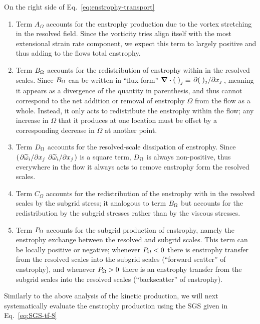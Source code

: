On the right side of Eq.~\ref{eq:enstrophy-transport}
\begin{enumerate}
    \item   
        Term $A_{\Omega}$ accounts for the enstrophy production due to the vortex stretching in the
        resolved field. Since the vorticity tries align itself  with the most extensional strain
        rate component, we expect this term to largely positive and thus adding to the flows total
        enstrophy.
        
    \item
        Term $B_{\Omega}$ accounts for the redistribution of enstrophy within in the resolved scales.
        Since $B_{\Omega}$ can be written in ``flux form'' $\div(\;)_{j} \equiv \pdv*{(\;)_{j}}{x_{j}}$, meaning it
        appears as a divergence of the quantity in parenthesis, and thus cannot correspond to the
        net addition or removal of enstrophy $\Omega$ from the flow as a whole. Instead, it only
        acts to redistribute the enstrophy within the flow; any increase in $\Omega$ that it
        produces at one location must be offset by a corresponding decrease in $\Omega$ at another
        point.   

    \item
        Term $D_{\Omega}$ accounts for the resolved-scale dissipation of enstrophy. Since
        $\left(\pdv*{\widetilde{\omega}_{i}}{x_{j}} \pdv*{\widetilde{\omega}_{i}}{x_{j}}\right)$ is
        a square term, $D_{\Omega}$ is always non-positive, thus everywhere in the flow it always acts
        to remove enstrophy form the resolved scales.
       
    \item
        Term $C_{\Omega}$ accounts for the redistribution of the enstrophy with in the resolved scales
        by the subgrid stress; it analogous to term $B_{\Omega}$ but accounts for the redistribution by
        the subgrid stresses rather than by the viscous stresses.

    \item
        Term $P_{\Omega}$ accounts for the subgrid production of enstrophy, namely the enstrophy
        exchange between the resolved and subgrid scales. This term can be locally positive or
        negative; whenever $P_{\Omega} < 0 $ there is enstrophy transfer from the resolved scales into
        the subgrid scales (``forward scatter'' of enstrophy), and whenever $P_{\Omega} >0$ there is an
        enstrophy transfer from the subgrid scales into the resolved scales (``backscatter'' of
        enstrophy).
\end{enumerate}

Similarly to the above analysis of the kinetic production, we will next 
systematically evaluate the enstrophy production using the SGS given in
Eq.~\ref{eq:SGS-tf-8} 



